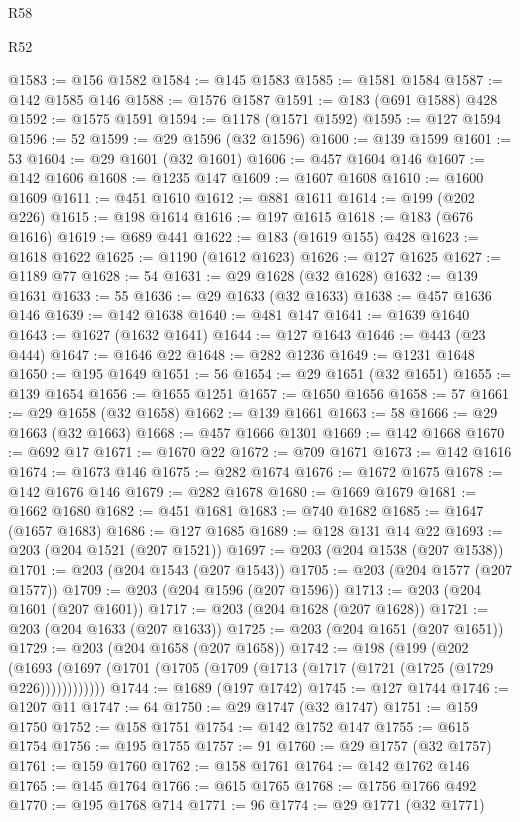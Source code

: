 \begin{lexlean}{R58}
\begin{lexlean}{R52}
\begin{coremodule}
{{{{{{{{{{{{{{{{{{{{{{{{{{{{{{{{{{{{{{{{{{{{{{{{{{{{{{{{{{{{{{{{{{{{{{{{{{{{{{{{{{{{{{{{{{{{{{{{{{{{{{{{{{{{{{{{{{{{{{{{{{{{{{{{{{{{{{{{{{{{{{{{{{{{{{{{{{{{{{{{{{{{{{{{{{{{{{{{{{{{{{{{{{{{{{{{{{{{{{@1583 := @156 @1582
@1584 := @145 @1583
@1585 := @1581 @1584
@1587 := @142 @1585 @146
@1588 := @1576 @1587
@1591 := @183 (@691 @1588) @428
@1592 := @1575 @1591
@1594 := @1178 (@1571 @1592)
@1595 := @127 @1594
@1596 := 52
@1599 := @29 @1596 (@32 @1596)
@1600 := @139 @1599
@1601 := 53
@1604 := @29 @1601 (@32 @1601)
@1606 := @457 @1604 @146
@1607 := @142 @1606
@1608 := @1235 @147
@1609 := @1607 @1608
@1610 := @1600 @1609
@1611 := @451 @1610
@1612 := @881 @1611
@1614 := @199 (@202 @226)
@1615 := @198 @1614
@1616 := @197 @1615
@1618 := @183 (@676 @1616)
@1619 := @689 @441
@1622 := @183 (@1619 @155) @428
@1623 := @1618 @1622
@1625 := @1190 (@1612 @1623)
@1626 := @127 @1625
@1627 := @1189 @77
@1628 := 54
@1631 := @29 @1628 (@32 @1628)
@1632 := @139 @1631
@1633 := 55
@1636 := @29 @1633 (@32 @1633)
@1638 := @457 @1636 @146
@1639 := @142 @1638
@1640 := @481 @147
@1641 := @1639 @1640
@1643 := @1627 (@1632 @1641)
@1644 := @127 @1643
@1646 := @443 (@23 @444)
@1647 := @1646 @22
@1648 := @282 @1236
@1649 := @1231 @1648
@1650 := @195 @1649
@1651 := 56
@1654 := @29 @1651 (@32 @1651)
@1655 := @139 @1654
@1656 := @1655 @1251
@1657 := @1650 @1656
@1658 := 57
@1661 := @29 @1658 (@32 @1658)
@1662 := @139 @1661
@1663 := 58
@1666 := @29 @1663 (@32 @1663)
@1668 := @457 @1666 @1301
@1669 := @142 @1668
@1670 := @692 @17
@1671 := @1670 @22
@1672 := @709 @1671
@1673 := @142 @1616
@1674 := @1673 @146
@1675 := @282 @1674
@1676 := @1672 @1675
@1678 := @142 @1676 @146
@1679 := @282 @1678
@1680 := @1669 @1679
@1681 := @1662 @1680
@1682 := @451 @1681
@1683 := @740 @1682
@1685 := @1647 (@1657 @1683)
@1686 := @127 @1685
@1689 := @128 @131 @14 @22
@1693 := @203 (@204 @1521 (@207 @1521))
@1697 := @203 (@204 @1538 (@207 @1538))
@1701 := @203 (@204 @1543 (@207 @1543))
@1705 := @203 (@204 @1577 (@207 @1577))
@1709 := @203 (@204 @1596 (@207 @1596))
@1713 := @203 (@204 @1601 (@207 @1601))
@1717 := @203 (@204 @1628 (@207 @1628))
@1721 := @203 (@204 @1633 (@207 @1633))
@1725 := @203 (@204 @1651 (@207 @1651))
@1729 := @203 (@204 @1658 (@207 @1658))
@1742 := @198
    (@199
      (@202 (@1693 (@1697 (@1701 (@1705 (@1709 (@1713 (@1717 (@1721 (@1725 (@1729 @226))))))))))))
@1744 := @1689 (@197 @1742)
@1745 := @127 @1744
@1746 := @1207 @11
@1747 := 64
@1750 := @29 @1747 (@32 @1747)
@1751 := @159 @1750
@1752 := @158 @1751
@1754 := @142 @1752 @147
@1755 := @615 @1754
@1756 := @195 @1755
@1757 := 91
@1760 := @29 @1757 (@32 @1757)
@1761 := @159 @1760
@1762 := @158 @1761
@1764 := @142 @1762 @146
@1765 := @145 @1764
@1766 := @615 @1765
@1768 := @1756 @1766 @492
@1770 := @195 @1768 @714
@1771 := 96
@1774 := @29 @1771 (@32 @1771)
}}}}}}}}}}}}}}}}}}}}}}}}}}}}}}}}}}}}}}}}}}}}}}}}}}}}}}}}}}}}}}}}}}}}}}}}}}}}}}}}}}}}}}}}}}}}}}}}}}}}}}}}}}}}}}}}}}}}}}}}}}}}}}}}}}}}}}}}}}}}}}}}}}}}}}}}}}}}}}}}}}}}}}}}}}}}}}}}}}}}}}}}}}}}}}}}}}}}}}
\end{coremodule}
\end{lexlean}
\end{lexlean}
